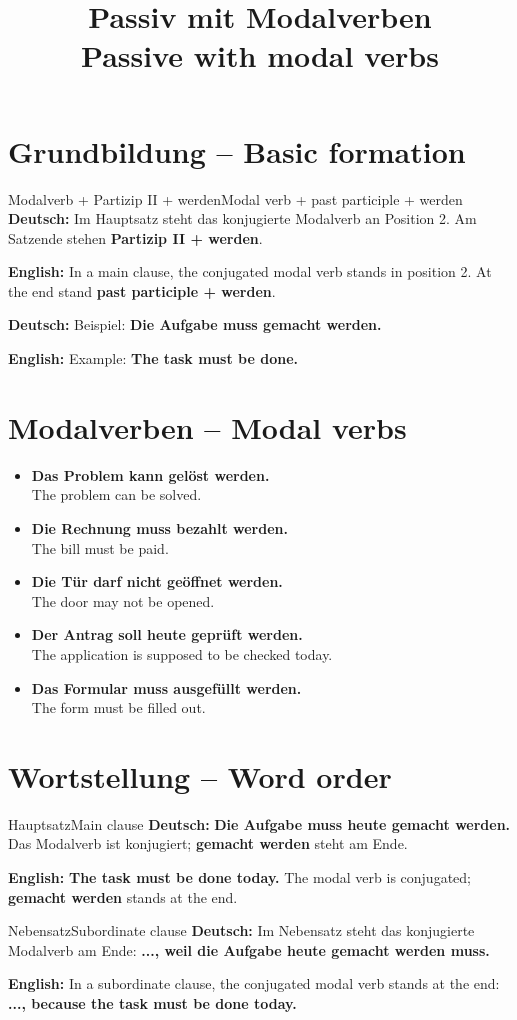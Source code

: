 \documentclass[a4paper,11pt]{article}
\title{Passiv mit Modalverben\\[0.3em]\large\textnormal{Passive with modal verbs}}
\date{}
\newcommand{\GermanText}[1]{\textbf{Deutsch: }#1\par}
\newcommand{\EnglishText}[1]{{\small\color{SoftGray}\textbf{English: }#1\par}}
\newcommand{\ExampleItem}[2]{\item \textbf{#1}\\{\small\color{SoftGray}#2}}
\begin{document}
\maketitle
\tableofcontents
\newpage

\section{Grundbildung -- Basic formation}
\begin{grammarentry}{Modalverb + Partizip II + werden}{Modal verb + past participle + werden}
\GermanText{Im Hauptsatz steht das konjugierte Modalverb an Position 2. Am Satzende stehen \textbf{Partizip II + werden}.}
\EnglishText{In a main clause, the conjugated modal verb stands in position 2. At the end stand \textbf{past participle + werden}.}
\GermanText{Beispiel: \textbf{Die Aufgabe muss gemacht werden.}}
\EnglishText{Example: \textbf{The task must be done.}}
\end{grammarentry}

\section{Modalverben -- Modal verbs}
\begin{exbox}\begin{itemize}
\ExampleItem{Das Problem kann gelöst werden.}{The problem can be solved.}
\ExampleItem{Die Rechnung muss bezahlt werden.}{The bill must be paid.}
\ExampleItem{Die Tür darf nicht geöffnet werden.}{The door may not be opened.}
\ExampleItem{Der Antrag soll heute geprüft werden.}{The application is supposed to be checked today.}
\ExampleItem{Das Formular muss ausgefüllt werden.}{The form must be filled out.}
\end{itemize}\end{exbox}

\section{Wortstellung -- Word order}
\begin{grammarentry}{Hauptsatz}{Main clause}
\GermanText{\textbf{Die Aufgabe muss heute gemacht werden.} Das Modalverb ist konjugiert; \textbf{gemacht werden} steht am Ende.}
\EnglishText{\textbf{The task must be done today.} The modal verb is conjugated; \textbf{gemacht werden} stands at the end.}
\end{grammarentry}
\begin{grammarentry}{Nebensatz}{Subordinate clause}
\GermanText{Im Nebensatz steht das konjugierte Modalverb am Ende: \textbf{..., weil die Aufgabe heute gemacht werden muss.}}
\EnglishText{In a subordinate clause, the conjugated modal verb stands at the end: \textbf{..., because the task must be done today.}}
\end{grammarentry}
\end{document}
